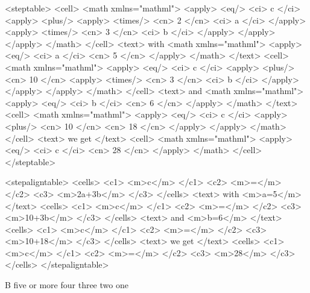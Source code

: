 \startbuffer
<steptable>
  <cell>
    <math xmlns="mathml">
      <apply> <eq/> <ci> c </ci>
        <apply> <plus/>
          <apply> <times/> <cn> 2 </cn> <ci> a </ci> </apply>
          <apply> <times/> <cn> 3 </cn> <ci> b </ci> </apply>
        </apply>
      </apply>
    </math>
  </cell>
  <text> with
    <math xmlns="mathml">
      <apply> <eq/> <ci> a </ci> <cn> 5 </cn> </apply>
    </math>
  </text>
  <cell>
    <math xmlns="mathml">
      <apply> <eq/> <ci> c </ci>
        <apply> <plus/> <cn> 10 </cn>
          <apply> <times/> <cn> 3 </cn> <ci> b </ci> </apply>
        </apply>
      </apply>
    </math>
  </cell>
  <text> and
    <math xmlns="mathml">
      <apply> <eq/> <ci> b </ci> <cn> 6 </cn> </apply>
    </math>
  </text>
  <cell>
    <math xmlns="mathml">
      <apply> <eq/> <ci> c </ci>
        <apply> <plus/> <cn> 10 </cn> <cn> 18 </cn> </apply>
      </apply>
    </math>
  </cell>
  <text>
    we get
  </text>
  <cell>
    <math xmlns="mathml">
      <apply> <eq/> <ci> c </ci> <cn> 28 </cn> </apply>
    </math>
  </cell>
</steptable>
\stopbuffer

\typebuffer \processxmlbuffer

\startbuffer
<stepaligntable>
  <cells>
    <c1> <m>c</m> </c1> <c2> <m>=</m> </c2> <c3> <m>2a+3b</m> </c3>
  </cells>
  <text>
    with <m>a=5</m>
  </text>
  <cells>
    <c1> <m>c</m> </c1> <c2> <m>=</m> </c2> <c3> <m>10+3b</m> </c3>
  </cells>
  <text>
    and <m>b=6</m>
  </text>
  <cells>
    <c1> <m>c</m> </c1> <c2> <m>=</m> </c2> <c3> <m>10+18</m> </c3>
  </cells>
  <text>
    we get
  </text>
  <cells>
    <c1> <m>c</m> </c1> <c2> <m>=</m> </c2> <c3> <m>28</m> </c3>
  </cells>
</stepaligntable>
\stopbuffer

\typebuffer \processxmlbuffer

\stopsection

\startsection[title=\TEX\ example]

\startbuffer
\startSTEPchart
{}            {B}
          {five or more} 
          {four}         
        {three}        
         {two}          
 {one}
\stopSTEPchart
\stopbuffer

\typebuffer \getbuffer

\startbuffer
\startSTEPchart
{}
          
          
        
         
\stopSTEPchart
\stopbuffer

